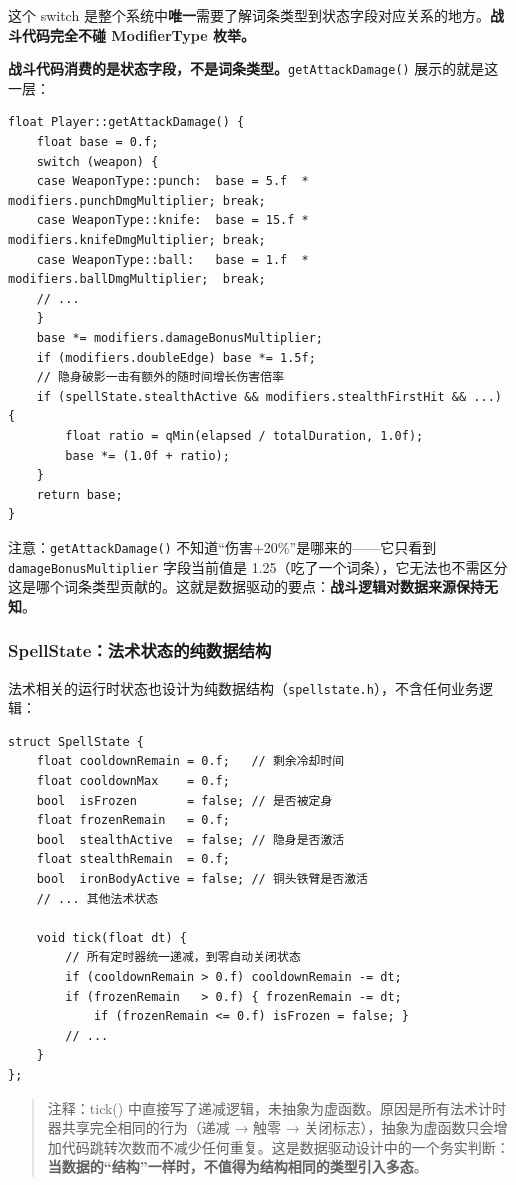 \documentclass[utf8]{ctexart}
\begin{document}
这个 switch 是整个系统中\textbf{唯一}需要了解词条类型到状态字段对应关系的地方。\textbf{战斗代码完全不碰 ModifierType 枚举。}

\textbf{战斗代码消费的是状态字段，不是词条类型。}\texttt{getAttackDamage()} 展示的就是这一层：

\begin{verbatim}
float Player::getAttackDamage() {
    float base = 0.f;
    switch (weapon) {
    case WeaponType::punch:  base = 5.f  * modifiers.punchDmgMultiplier; break;
    case WeaponType::knife:  base = 15.f * modifiers.knifeDmgMultiplier; break;
    case WeaponType::ball:   base = 1.f  * modifiers.ballDmgMultiplier;  break;
    // ...
    }
    base *= modifiers.damageBonusMultiplier;
    if (modifiers.doubleEdge) base *= 1.5f;
    // 隐身破影一击有额外的随时间增长伤害倍率
    if (spellState.stealthActive && modifiers.stealthFirstHit && ...) {
        float ratio = qMin(elapsed / totalDuration, 1.0f);
        base *= (1.0f + ratio);
    }
    return base;
}
\end{verbatim}

注意：\texttt{getAttackDamage()} 不知道“伤害+20\%”是哪来的——它只看到 \texttt{damageBonusMultiplier} 字段当前值是 1.25（吃了一个词条），它无法也不需区分这是哪个词条类型贡献的。这就是数据驱动的要点：\textbf{战斗逻辑对数据来源保持无知}。

\subsubsection{SpellState：法术状态的纯数据结构}

法术相关的运行时状态也设计为纯数据结构（\texttt{spellstate.h}），不含任何业务逻辑：

\begin{verbatim}
struct SpellState {
    float cooldownRemain = 0.f;   // 剩余冷却时间
    float cooldownMax    = 0.f;
    bool  isFrozen       = false; // 是否被定身
    float frozenRemain   = 0.f;
    bool  stealthActive  = false; // 隐身是否激活
    float stealthRemain  = 0.f;
    bool  ironBodyActive = false; // 铜头铁臂是否激活
    // ... 其他法术状态

    void tick(float dt) {
        // 所有定时器统一递减，到零自动关闭状态
        if (cooldownRemain > 0.f) cooldownRemain -= dt;
        if (frozenRemain   > 0.f) { frozenRemain -= dt;
            if (frozenRemain <= 0.f) isFrozen = false; }
        // ...
    }
};
\end{verbatim}

\begin{quote}
\small 注释：tick() 中直接写了递减逻辑，未抽象为虚函数。原因是所有法术计时器共享完全相同的行为（递减 → 触零 → 关闭标志），抽象为虚函数只会增加代码跳转次数而不减少任何重复。这是数据驱动设计中的一个务实判断：\textbf{当数据的“结构”一样时，不值得为结构相同的类型引入多态}。
\end{quote}
\end{document}
